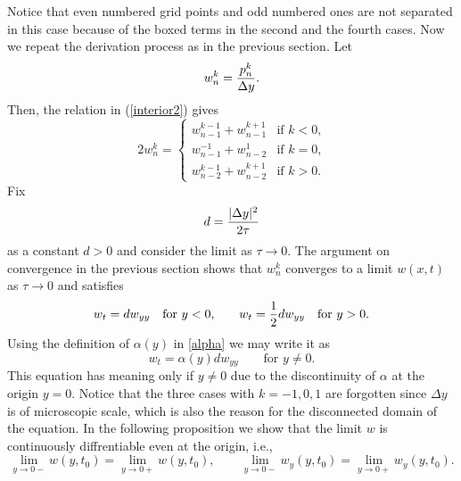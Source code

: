\documentclass[11pt]{amsart}
\def\d{d}
\begin{document}
Notice that even numbered grid points and odd numbered ones are not separated in this case because of the boxed terms in the second and the fourth cases. Now we repeat the derivation process as in the previous section. Let
$$
w_n^k={p_n^k\over \Delta y}.
$$
Then, the relation in (\ref{interior2}) gives
\begin{equation}\label{w}
2w_n^k=
\begin{cases}
w_{n-1}^{k-1}+w_{n-1}^{k+1} & \text{if $k<0$,}\\
w_{n-1}^{-1}+w_{n-2}^{1} & \text{if $k=0$,}\\
w_{n-2}^{k-1}+w_{n-2}^{k+1} & \text{if $k>0$.}
\end{cases}
\end{equation}
Fix
$$
\d={|\Delta y|^2\over 2\tau}
$$
as a constant $\d>0$ and consider the limit as $\tau\to0$. The argument on convergence in the previous section shows that $w_n^k$ converges to a limit $w(x,t)$ as $\tau\to0$ and satisfies
$$
w_t=\d w_{yy}\quad\text{for $y<0,$}\qquad
w_t={1\over2}\d w_{yy}\quad\text{for $y>0$.}
$$
Using the definition of $\alpha(y)$ in \eqref{alpha} we may write it as
\begin{equation}\label{EqnForPinY2}
w_t=\alpha(y)\d w_{yy} \qquad \text{for $y\ne0$.}
\end{equation}
This equation has meaning only if $y\ne0$ due to the discontinuity of $\alpha$ at the origin $y=0$. Notice that the three cases with $k=-1,0,1$ are forgotten since $\Delta y$ is of microscopic scale, which is also the reason for the disconnected domain of the equation. In the following proposition we show that the limit $w$ is continuously diffrentiable even at the origin, i.e.,
\begin{equation*}\label{continuity}
\lim_{y\to0-}w(y,t_0)=\lim_{y\to0+}w(y,t_0),\qquad
\lim_{y\to0-}w_y(y,t_0)=\lim_{y\to0+}w_y(y,t_0).
\end{equation*}
\end{document}
